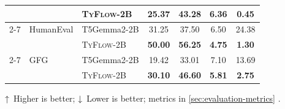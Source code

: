 \documentclass[manuscript,screen]{acmart}
\newcommand{\updir}{\textcolor{black}{↑}}  %
\newcommand{\downdir}{\textcolor{black}{↓}}
\newcommand{\toolname}[1]{\textsc{#1}}
\newcommand{\mainname}{\toolname{TyFlow}\xspace}
\begin{document}
\begin{table}[ht]
\begin{threeparttable}
\begin{tabular}{
    l 
    l
    l
    c 
    c 
    c 
    c
}
        &       & \mainname{\color{revblue}-2B        }& \textbf{\color{revblue}25.37} & \textbf{\color{revblue}43.28} & \textbf{\color{revblue}6.36} & \textbf{\color{revblue}0.45} \\
        \cmidrule(lr){2-7}
        & {\color{revblue}HumanEval }&  T5Gemma2-2B &    {\color{revblue}31.25 } &    {\color{revblue}37.50 } &    {\color{revblue}6.50 } &    {\color{revblue}24.38 } \\
 &       &  \mainname   {\color{revblue}-2B        } &    \textbf{\color{revblue}50.00}  &    \textbf{\color{revblue}56.25}  &    \textbf{\color{revblue}4.75}  &    \textbf{\color{revblue}1.30}  \\
         \cmidrule(lr){2-7}
         &  {\color{revblue}GFG }& {\color{revblue}T5Gemma2-2B }& {\color{revblue}19.42 }& {\color{revblue}33.01 }& {\color{revblue}7.10 }& {\color{revblue}13.69 }\\
        &      &  \mainname-2B        & \textbf{\color{revblue}30.10} & \textbf{\color{revblue}46.60} & \textbf{\color{revblue}5.81} & \textbf{\color{revblue}2.75} \\
\bottomrule
\end{tabular}
\begin{tablenotes}
\footnotesize
\item \updir\, Higher is better; \downdir\, Lower is better;  \textbf{} %
  {\color{revblue}metrics in } \autoref{sec:evaluation-metrics}  .
\end{tablenotes}
\end{threeparttable}
\end{table}
\end{document}
